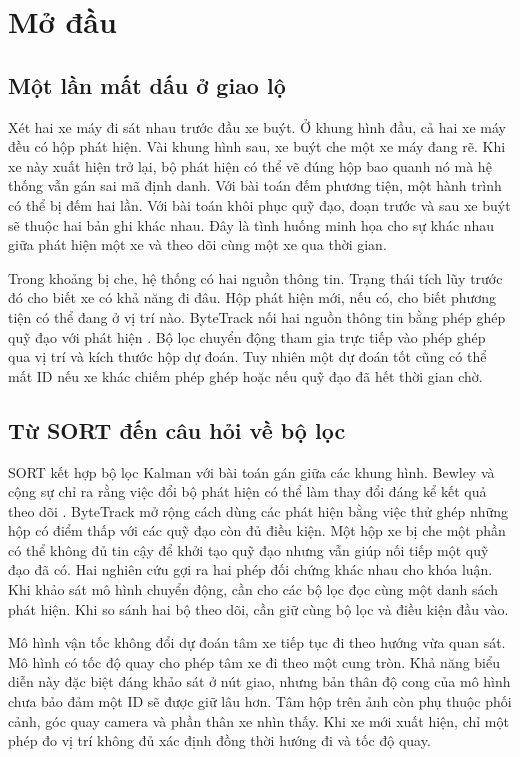 \chapter{Mở đầu}
\section{Một lần mất dấu ở giao lộ}
Xét hai xe máy đi sát nhau trước đầu xe buýt. Ở khung hình đầu, cả hai xe máy đều có hộp phát hiện. Vài khung hình sau, xe buýt che một xe máy đang rẽ. Khi xe này xuất hiện trở lại, bộ phát hiện có thể vẽ đúng hộp bao quanh nó mà hệ thống vẫn gán sai mã định danh. Với bài toán đếm phương tiện, một hành trình có thể bị đếm hai lần. Với bài toán khôi phục quỹ đạo, đoạn trước và sau xe buýt sẽ thuộc hai bản ghi khác nhau. Đây là tình huống minh họa cho sự khác nhau giữa phát hiện một xe và theo dõi cùng một xe qua thời gian.

Trong khoảng bị che, hệ thống có hai nguồn thông tin. Trạng thái tích lũy trước đó cho biết xe có khả năng đi đâu. Hộp phát hiện mới, nếu có, cho biết phương tiện có thể đang ở vị trí nào. ByteTrack nối hai nguồn thông tin bằng phép ghép quỹ đạo với phát hiện \cite{zhang2022bytetrack}. Bộ lọc chuyển động tham gia trực tiếp vào phép ghép qua vị trí và kích thước hộp dự đoán. Tuy nhiên một dự đoán tốt cũng có thể mất ID nếu xe khác chiếm phép ghép hoặc nếu quỹ đạo đã hết thời gian chờ.

\section{Từ SORT đến câu hỏi về bộ lọc}
SORT kết hợp bộ lọc Kalman với bài toán gán giữa các khung hình. Bewley và cộng sự chỉ ra rằng việc đổi bộ phát hiện có thể làm thay đổi đáng kể kết quả theo dõi \cite{sort}. ByteTrack mở rộng cách dùng các phát hiện bằng việc thử ghép những hộp có điểm thấp với các quỹ đạo còn đủ điều kiện. Một hộp xe bị che một phần có thể không đủ tin cậy để khởi tạo quỹ đạo nhưng vẫn giúp nối tiếp một quỹ đạo đã có. Hai nghiên cứu gợi ra hai phép đối chứng khác nhau cho khóa luận. Khi khảo sát mô hình chuyển động, cần cho các bộ lọc đọc cùng một danh sách phát hiện. Khi so sánh hai bộ theo dõi, cần giữ cùng bộ lọc và điều kiện đầu vào.

Mô hình vận tốc không đổi dự đoán tâm xe tiếp tục đi theo hướng vừa quan sát. Mô hình có tốc độ quay cho phép tâm xe đi theo một cung tròn. Khả năng biểu diễn này đặc biệt đáng khảo sát ở nút giao, nhưng bản thân độ cong của mô hình chưa bảo đảm một ID sẽ được giữ lâu hơn. Tâm hộp trên ảnh còn phụ thuộc phối cảnh, góc quay camera và phần thân xe nhìn thấy. Khi xe mới xuất hiện, chỉ một phép đo vị trí không đủ xác định đồng thời hướng đi và tốc độ quay.

